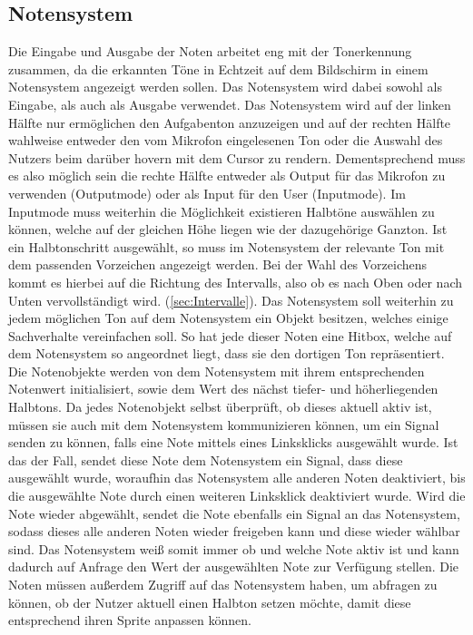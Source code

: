 \subsection{Notensystem}
Die Eingabe und Ausgabe der Noten arbeitet eng mit der Tonerkennung zusammen, da die erkannten Töne in Echtzeit auf dem Bildschirm in einem Notensystem angezeigt werden sollen. Das Notensystem wird dabei sowohl als Eingabe, als auch als Ausgabe verwendet. Das Notensystem wird auf der linken Hälfte nur ermöglichen den Aufgabenton anzuzeigen und auf der rechten Hälfte wahlweise entweder den vom Mikrofon eingelesenen Ton oder die Auswahl des Nutzers beim darüber hovern mit dem Cursor zu rendern. Dementsprechend muss es also möglich sein die rechte Hälfte entweder als Output für das Mikrofon zu verwenden (Outputmode) oder als Input für den User (Inputmode).
Im Inputmode muss weiterhin die Möglichkeit existieren Halbtöne auswählen zu können, welche auf der gleichen Höhe liegen wie der dazugehörige Ganzton. Ist ein Halbtonschritt ausgewählt, so muss im Notensystem der relevante Ton mit dem passenden Vorzeichen angezeigt werden. Bei der Wahl des Vorzeichens kommt es hierbei auf die Richtung des Intervalls, also ob es nach Oben oder nach Unten vervollständigt wird. (\ref{sec:Intervalle}). 
Das Notensystem soll weiterhin zu jedem möglichen Ton auf dem Notensystem ein Objekt besitzen, welches einige Sachverhalte vereinfachen soll. So hat jede dieser Noten eine Hitbox, welche auf dem Notensystem so angeordnet liegt, dass sie den dortigen Ton repräsentiert. Die Notenobjekte werden von dem Notensystem mit ihrem entsprechenden Notenwert initialisiert, sowie dem Wert des nächst tiefer- und höherliegenden Halbtons. Da jedes Notenobjekt selbst überprüft, ob dieses aktuell aktiv ist, müssen sie auch mit dem Notensystem kommunizieren können, um ein Signal senden zu können, falls eine Note mittels eines Linksklicks ausgewählt wurde. Ist das der Fall, sendet diese Note dem Notensystem ein Signal, dass diese ausgewählt wurde, woraufhin das Notensystem alle anderen Noten deaktiviert, bis die ausgewählte Note durch einen weiteren Linksklick deaktiviert wurde. Wird die Note wieder abgewählt, sendet die Note ebenfalls ein Signal an das Notensystem, sodass dieses alle anderen Noten wieder freigeben kann und diese wieder wählbar sind. Das Notensystem weiß somit immer ob und welche Note aktiv ist und kann dadurch auf Anfrage den Wert der ausgewählten Note zur Verfügung stellen. Die Noten müssen außerdem Zugriff auf das Notensystem haben, um abfragen zu können, ob der Nutzer aktuell einen Halbton setzen möchte, damit diese entsprechend ihren Sprite anpassen können. 
